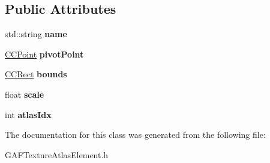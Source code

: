 \subsection*{Public Attributes}
\begin{DoxyCompactItemize}
\item 
\hypertarget{class_g_a_f_1_1_g_a_f_texture_atlas_element_a217bca4bac88f8831fba1390c5b4b956}{std\-::string {\bfseries name}}\label{class_g_a_f_1_1_g_a_f_texture_atlas_element_a217bca4bac88f8831fba1390c5b4b956}

\item 
\hypertarget{class_g_a_f_1_1_g_a_f_texture_atlas_element_a8a1316509fa831388743a1711f0d9e9a}{\hyperlink{class_g_a_f_1_1_c_c_point}{C\-C\-Point} {\bfseries pivot\-Point}}\label{class_g_a_f_1_1_g_a_f_texture_atlas_element_a8a1316509fa831388743a1711f0d9e9a}

\item 
\hypertarget{class_g_a_f_1_1_g_a_f_texture_atlas_element_ae40fb8e6364450701e2e36701c9eacf6}{\hyperlink{class_g_a_f_1_1_c_c_rect}{C\-C\-Rect} {\bfseries bounds}}\label{class_g_a_f_1_1_g_a_f_texture_atlas_element_ae40fb8e6364450701e2e36701c9eacf6}

\item 
\hypertarget{class_g_a_f_1_1_g_a_f_texture_atlas_element_acc6e12d090dd67c5e5995b9e57fa491c}{float {\bfseries scale}}\label{class_g_a_f_1_1_g_a_f_texture_atlas_element_acc6e12d090dd67c5e5995b9e57fa491c}

\item 
\hypertarget{class_g_a_f_1_1_g_a_f_texture_atlas_element_a94cafb272c7ddae6981a20d0b34e6d55}{int {\bfseries atlas\-Idx}}\label{class_g_a_f_1_1_g_a_f_texture_atlas_element_a94cafb272c7ddae6981a20d0b34e6d55}

\end{DoxyCompactItemize}


The documentation for this class was generated from the following file\-:\begin{DoxyCompactItemize}
\item 
G\-A\-F\-Texture\-Atlas\-Element.\-h\end{DoxyCompactItemize}
